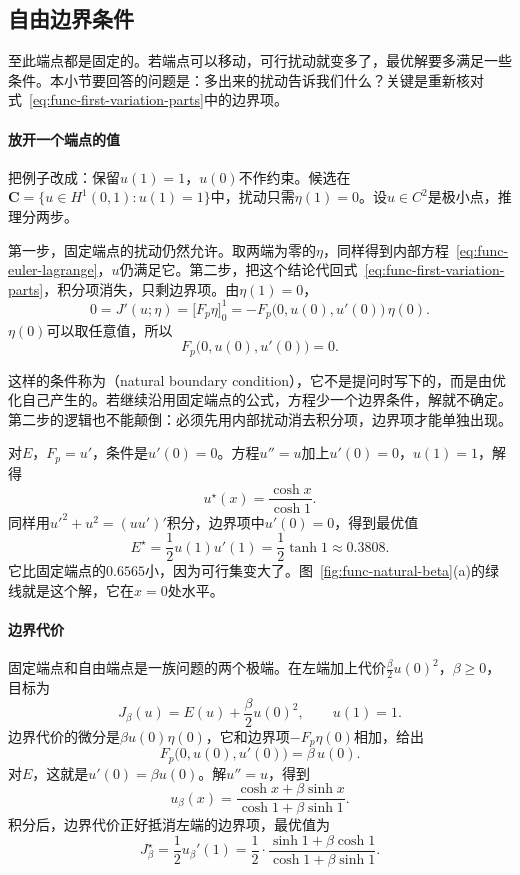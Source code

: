\subsection{自由边界条件}
\label{sec:func-free-boundary}

至此端点都是固定的。若端点可以移动，可行扰动就变多了，最优解要多满足一些条件。本小节要回答的问题是：多出来的扰动告诉我们什么？关键是重新核对式~\eqref{eq:func-first-variation-parts}中的边界项。

\paragraph{放开一个端点的值}
把例子改成：保留$u(1)=1$，$u(0)$不作约束。候选在$\bm{C}=\{u\in H^1(0,1):u(1)=1\}$中，扰动只需$\eta(1)=0$。设$u\in C^2$是极小点，推理分两步。

第一步，固定端点的扰动仍然允许。取两端为零的$\eta$，同样得到内部方程~\eqref{eq:func-euler-lagrange}，$u$仍满足它。第二步，把这个结论代回式~\eqref{eq:func-first-variation-parts}，积分项消失，只剩边界项。由$\eta(1)=0$，
\[
 0=J'(u;\eta)=\bigl[F_p\eta\bigr]_0^1=-F_p\bigl(0,u(0),u'(0)\bigr)\,\eta(0).
\]
$\eta(0)$可以取任意值，所以
\begin{equation}
 F_p\bigl(0,u(0),u'(0)\bigr)=0.
 \label{eq:func-natural}
\end{equation}

这样的条件称为（natural boundary condition），它不是提问时写下的，而是由优化自己产生的。若继续沿用固定端点的公式，方程少一个边界条件，解就不确定。第二步的逻辑也不能颠倒：必须先用内部扰动消去积分项，边界项才能单独出现。

对$E$，$F_p=u'$，条件是$u'(0)=0$。方程$u''=u$加上$u'(0)=0$，$u(1)=1$，解得
\begin{equation}
 u^\star(x)=\frac{\cosh x}{\cosh1}.
 \label{eq:func-free-solution}
\end{equation}
同样用$u'^2+u^2=(uu')'$积分，边界项中$u'(0)=0$，得到最优值
\[
 E^\star=\frac12u(1)u'(1)=\frac12\tanh1\approx0.3808.
\]
它比固定端点的$0.6565$小，因为可行集变大了。图~\ref{fig:func-natural-beta}(a)的绿线就是这个解，它在$x=0$处水平。

\paragraph{边界代价}
固定端点和自由端点是一族问题的两个极端。在左端加上代价$\frac\beta2u(0)^2$，$\beta\geq0$，目标为
\begin{equation}
 J_\beta(u)=E(u)+\frac{\beta}{2}u(0)^2,\qquad u(1)=1.
 \label{eq:func-robin}
\end{equation}
边界代价的微分是$\beta u(0)\eta(0)$，它和边界项$-F_p\eta(0)$相加，给出
\begin{equation}
 F_p\bigl(0,u(0),u'(0)\bigr)=\beta\,u(0).
 \label{eq:func-robin-condition}
\end{equation}
对$E$，这就是$u'(0)=\beta u(0)$。解$u''=u$，得到
\[
 u_\beta(x)=\frac{\cosh x+\beta\sinh x}{\cosh1+\beta\sinh1}.
\]
积分后，边界代价正好抵消左端的边界项，最优值为
\[
 J_\beta^\star=\frac12u_\beta'(1)=\frac12\cdot\frac{\sinh1+\beta\cosh1}{\cosh1+\beta\sinh1}.
\]

